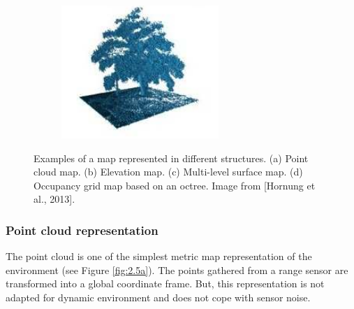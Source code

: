 \begin{figure}[H]
\begin{subfigure}[H]{0.4\linewidth}
    \end{subfigure}
    \begin{subfigure}[H]{0.4\linewidth}
        \centering
        \includegraphics[width=\linewidth]{assets/2_5_d.png}
        \caption{{}}
        \label{fig:2.5d}
    \end{subfigure}
    \caption{Examples of a map represented in diﬀerent structures. (a) Point cloud map. (b) Elevation map. (c) Multi-level surface map. (d) Occupancy grid map based on an octree. Image from [Hornung et al., 2013].}
    \label{fig:2.5}
\end{figure}
\subsubsection{Point cloud representation}
The point cloud is one of the simplest metric map representation of the environment (see Figure \ref{fig:2.5a}). The points gathered from a range sensor are transformed into a global coordinate frame. But, this representation is not adapted for dynamic environment and does not cope with sensor noise.
